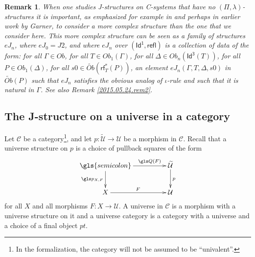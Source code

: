 \documentclass[12pt]{article}
\numberwithin{equation}{section}
\newtheorem{remark}[proposition]{Remark}
\newcommand{\llabel}[1]{\label{#1}}
\newcommand{\sr}{\rightarrow}
\newcommand{\wt}{\widetilde}
\newcommand{\aCC}{{\mathbb C}}  %
\newcommand{\Id}{\mathsf{Id^1}} %
\newcommand{\Idx}{\mathsf{Id^3}} %
\newcommand{\refl}{\mathsf{refl}}
\newcommand{\U}{\mathcal{U}}
\newcommand{\rf}{\mathsf{rf}}
\begin{document}
%



%
\begin{remark}\rm
\llabel{2015.05.24.rem1} When one studies J-structures on C-systems that have
no $(\Pi,\lambda)$-structures it is important, as emphasized for example in
\cite{vandenBergGarner2011} and perhaps in earlier work by Garner,
to consider a more complex structure than the one
that we consider here. This more complex structure can be seen as a family of
structures $eJ_n$, where $eJ_0=J2$, and where $eJ_n$ over $(\Id,\refl)$ is a
collection of data of the form: for all $\Gamma\in Ob$, for all $T\in
Ob_1(\Gamma)$, for all $\Delta\in Ob_{n}(\Idx(T))$, for all $P\in
Ob_1(\Delta)$, for all $s0\in \wt{Ob}(\rf_T^*(P))$, an element
$eJ_n(\Gamma,T,\Delta,s0)$ in $\wt{Ob}(P)$ such that $eJ_n$ satisfies the
obvious analog of $\iota$-rule and such that it is natural in $\Gamma$. See
also Remark \ref{2015.05.24.rem2}.
\end{remark}









\subsection{The J-structure on a universe in a category}
%
Let $\mathcal C$ be a category\footnote{In the formalization, the category will not be assumed to be ``univalent''.},
and let $p:\wt{\U}\sr \U$ be a morphism in
$\mathcal C$. Recall that a universe structure on $p$ is a choice of pullback
squares of the form
%
$$
\begin{xy}
          \xymatrix@C=4pc{ \gls{semicolon} \ar[r]^-{\gls Q(F)} \ar[d]_{\gls p_{X,F}} & \wt{\U}
            \ar[d]^{p}\\ X \ar[r]^{F} & \U }
\end{xy}
$$
%
for all $X$ and all morphisms $F:X\sr \U$. A universe in $\mathcal C$ is a
morphism with a universe structure on it and a universe category is a category
with a universe and a choice of a final object $pt$.
\end{document}
